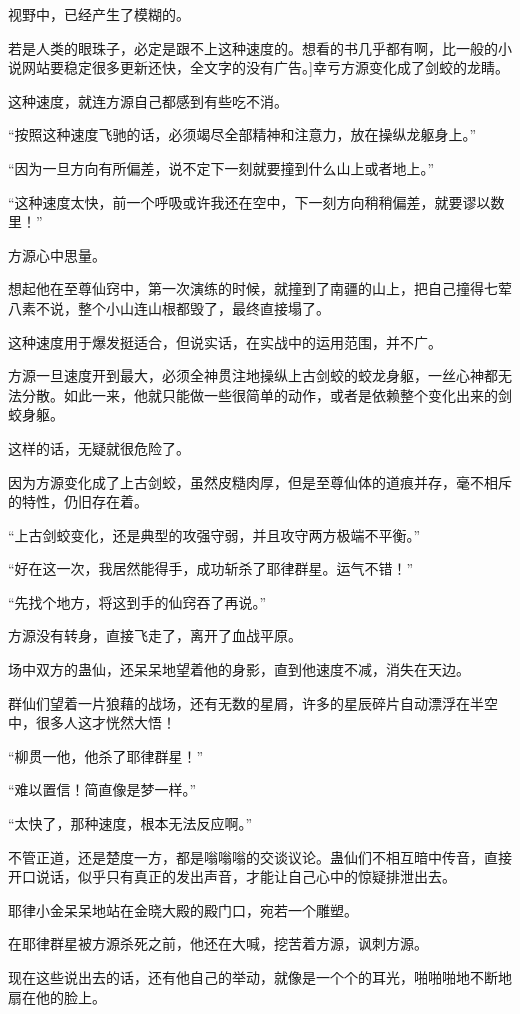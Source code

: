 \begin{this_body}
视野中，已经产生了模糊的。

若是人类的眼珠子，必定是跟不上这种速度的。想看的书几乎都有啊，比一般的小说网站要稳定很多更新还快，全文字的没有广告。]幸亏方源变化成了剑蛟的龙睛。

这种速度，就连方源自己都感到有些吃不消。

“按照这种速度飞驰的话，必须竭尽全部精神和注意力，放在操纵龙躯身上。”

“因为一旦方向有所偏差，说不定下一刻就要撞到什么山上或者地上。”

“这种速度太快，前一个呼吸或许我还在空中，下一刻方向稍稍偏差，就要谬以数里！”

方源心中思量。

想起他在至尊仙窍中，第一次演练的时候，就撞到了南疆的山上，把自己撞得七荤八素不说，整个小山连山根都毁了，最终直接塌了。

这种速度用于爆发挺适合，但说实话，在实战中的运用范围，并不广。

方源一旦速度开到最大，必须全神贯注地操纵上古剑蛟的蛟龙身躯，一丝心神都无法分散。如此一来，他就只能做一些很简单的动作，或者是依赖整个变化出来的剑蛟身躯。

这样的话，无疑就很危险了。

因为方源变化成了上古剑蛟，虽然皮糙肉厚，但是至尊仙体的道痕并存，毫不相斥的特性，仍旧存在着。

“上古剑蛟变化，还是典型的攻强守弱，并且攻守两方极端不平衡。”

“好在这一次，我居然能得手，成功斩杀了耶律群星。运气不错！”

“先找个地方，将这到手的仙窍吞了再说。”

方源没有转身，直接飞走了，离开了血战平原。

场中双方的蛊仙，还呆呆地望着他的身影，直到他速度不减，消失在天边。

群仙们望着一片狼藉的战场，还有无数的星屑，许多的星辰碎片自动漂浮在半空中，很多人这才恍然大悟！

“柳贯一他，他杀了耶律群星！”

“难以置信！简直像是梦一样。”

“太快了，那种速度，根本无法反应啊。”

不管正道，还是楚度一方，都是嗡嗡嗡的交谈议论。蛊仙们不相互暗中传音，直接开口说话，似乎只有真正的发出声音，才能让自己心中的惊疑排泄出去。

耶律小金呆呆地站在金晓大殿的殿门口，宛若一个雕塑。

在耶律群星被方源杀死之前，他还在大喊，挖苦着方源，讽刺方源。

现在这些说出去的话，还有他自己的举动，就像是一个个的耳光，啪啪啪地不断地扇在他的脸上。


\end{this_body}
